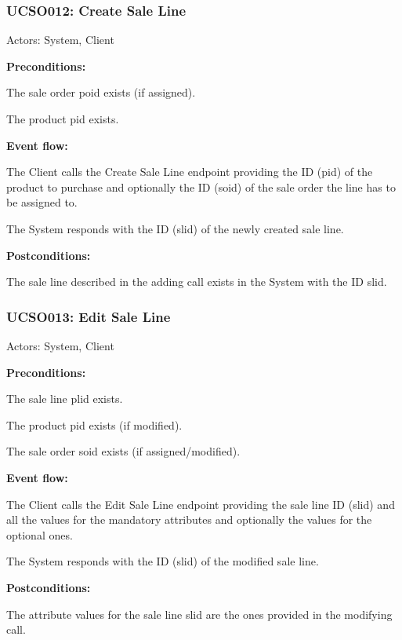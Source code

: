 \begin{ucbox}{\subsubsection{UCSO012: Create Sale Line}}
\label{UCSO012}

Actors: System, Client

\textbf{Preconditions:}

\ucitem The sale order poid exists (if assigned).

\ucitem The product pid exists.

\textbf{Event flow:}

\ucitem The Client calls the Create Sale Line endpoint providing the ID (pid) of the product to purchase and optionally the ID (soid) of the sale order the line has to be 
assigned to.

\ucitem The System responds with the ID (slid) of the newly created sale line.

\textbf{Postconditions:}

\ucitem The sale line described in the adding call exists in the System with the ID slid.

\end{ucbox}

\begin{ucbox}{\subsubsection{UCSO013: Edit Sale Line}}
\label{UCSO013}

Actors: System, Client

\textbf{Preconditions:}

\ucitem The sale line plid exists.

\ucitem The product pid exists (if modified).

\ucitem The sale order soid exists (if assigned/modified).

\textbf{Event flow:}

\ucitem The Client calls the Edit Sale Line endpoint providing the sale line ID (slid) and all the values for the mandatory attributes and optionally the values for the optional 
ones.

\ucitem The System responds with the ID (slid) of the modified sale line.

\textbf{Postconditions:}

\ucitem The attribute values for the sale line slid are the ones provided in the modifying call.

\end{ucbox}

